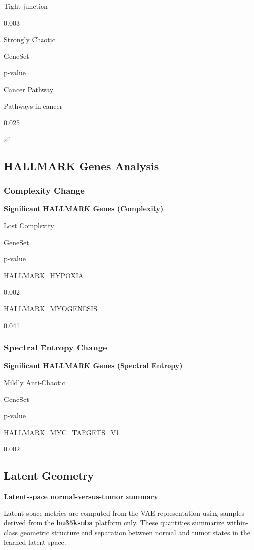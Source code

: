 \documentclass[
  letterpaper,
  DIV=11,
  numbers=noendperiod,
  openany,
  oneside]{scrreprt}
\begin{document}
Tight junction

0.003

Strongly Chaotic

GeneSet

p-value

Cancer Pathway

Pathways in cancer

0.025

✅

\subsection{HALLMARK Genes Analysis}

\subsubsection{Complexity Change}

\textbf{Significant HALLMARK Genes (Complexity)}

Lost Complexity

GeneSet

p-value

HALLMARK\_HYPOXIA

0.002

HALLMARK\_MYOGENESIS

0.041

\subsubsection{Spectral Entropy Change}

\textbf{Significant HALLMARK Genes (Spectral Entropy)}

Mildly Anti-Chaotic

GeneSet

p-value

HALLMARK\_MYC\_TARGETS\_V1

0.002

\subsection{Latent Geometry}

\textbf{Latent-space normal-versus-tumor summary}

Latent-space metrics are computed from the VAE representation using
samples derived from the \textbf{hu35ksuba} platform only. These
quantities summarize within-class geometric structure and separation
between normal and tumor states in the learned latent space.
\end{document}
